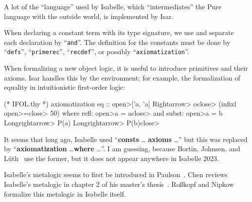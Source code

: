 \begin{node}[Isar]\label{isabelle:metalogic-0008}%
A lot of the ``language'' used by Isabelle, which ``intermediates'' the
Pure language with the outside world, is implemented by Isar.

\begin{definition}
When declaring a constant term with its type signature, we use 
and separate each declaration by ``\texttt{and}''. The definition for
the constants must be done by ``\texttt{defs}'', ``\texttt{primerec}'',
``\texttt{recdef}'', or possibly ``\texttt{axiomatization}''.
\end{definition}

\begin{node}[Axiomatization]\label{isabelle:metalogic-0009}%
When formalizing a new object logic, it is useful to introduce
primitives and their axioms. Isar handles this by the
 environment; for example, the formalization of
equality in intuitionistic first-order logic:

\begin{Isabelle}
(* IFOL.thy *)
axiomatization
  eq :: \<open>['a, 'a] \<Rightarrow> o\<close>  (infixl \<open>=\<close> 50)
where
  refl: \<open>a = a\<close> and
  subst: \<open>a = b \<Longrightarrow> P(a) \<Longrightarrow> P(b)\<close>
\end{Isabelle}

\begin{node}[Remark]\label{isabelle:metalogic-000A}%
It seems that long ago, Isabelle used ``\textbf{consts} \dots
\textbf{axioms} \dots'' but this was replaced by
``\textbf{axiomatization} \dots \textbf{where} \dots''. I am guessing,
because Bortin, Johnsen, and L\"{u}th~\cite{bortin2006structured} use
the former, but it does not appear anywhere in Isabelle 2023.
\end{node}
\end{node}
\end{node}


\begin{node}[References]\label{isabelle:metalogic-0007}%
Isabelle's metalogic seems to first be introduced in Paulson~\cite{paulson1988foundation}.
Chen reviews Isabelle's metalogic in chapter 2 of his master's thesis~\cite{chen2019implementation}.
Ro{\ss}kopf and Nipkow~\cite{Rosskopf2022formalization} formalize this
metalogic in Isabelle itself.
\end{node}

